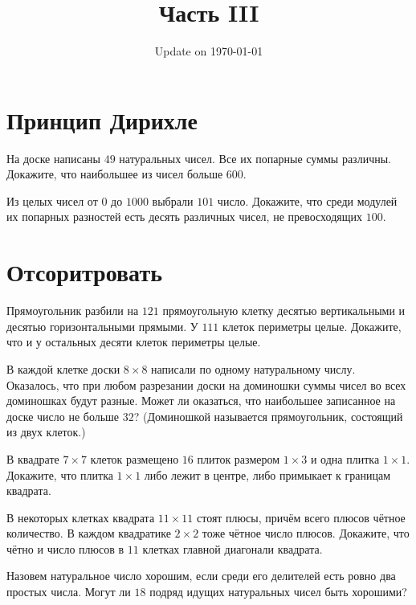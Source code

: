 \documentclass[12pt]{article}
\begin{document}
\fontsize{12}{12}\selectfont

\title{\bf \huge Часть III}
\date{Update on \today}
\maketitle 

\section*{Принцип Дирихле}

\begin{task}
На доске написаны $49$ натуральных чисел. Все их попарные суммы различны. Докажите, что наибольшее из чисел больше $600$.
\end{task}

\begin{task}
Из целых чисел от $0$ до $1000$ выбрали $101$ число. Докажите, что среди модулей их попарных разностей есть десять различных чисел, не превосходящих $100$.
\end{task}



\section*{Отсоритровать}

\begin{task}
\item Прямоугольник разбили на $121$ прямоугольную клетку десятью вертикальными и десятью горизонтальными прямыми. У $111$ клеток периметры целые. Докажите, что и у остальных десяти клеток периметры целые.
\end{task}

\begin{task} В каждой клетке доски $8 \times 8$ написали по одному натуральному числу. Оказалось, что при любом разрезании доски на доминошки суммы чисел во всех доминошках будут разные. Может ли оказаться, что наибольшее записанное на доске число не больше $32$? (Доминошкой называется прямоугольник, состоящий из двух клеток.)
\end{task}

\begin{task} В квадрате $7 \times 7$ клеток размещено $16$ плиток размером $1 \times 3$ и одна плитка $1 \times 1$. Докажите, что плитка $1 \times 1$ либо лежит в центре, либо примыкает к границам квадрата. 
\end{task}

\begin{task} В некоторых клетках квадрата $11 \times 11$ стоят плюсы, причём всего плюсов чётное количество. В каждом квадратике $2 \times 2$ тоже чётное число плюсов. Докажите, что чётно и число плюсов в $11$ клетках главной диагонали квадрата.
\end{task}

\begin{task} Назовем натуральное число хорошим, если среди его делителей есть ровно два простых числа. Могут ли $18$ подряд идущих натуральных чисел быть хорошими?
\end{task}
\end{document}
